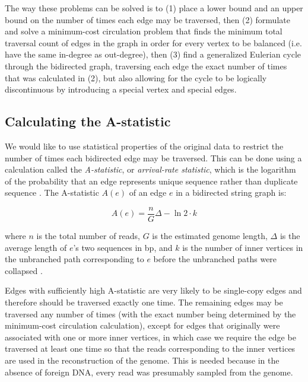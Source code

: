 \documentclass[12pt]{article}
\newcommand{\KeyTerm}[1]{{\it #1}}
\begin{document}
The way these problems can be solved is to (1) place a lower bound and an upper
bound on the number of times each edge may be traversed, then (2) formulate and
solve a minimum-cost circulation problem that finds the minimum total traversal
count of edges in the graph in order for every vertex to be balanced (i.e. have
the same in-degree as out-degree), then (3) find a generalized Eulerian cycle
through the bidirected graph, traversing each edge the exact number of times
that was calculated in (2), but also allowing for the cycle to be logically
discontinuous by introducing a special vertex and special edges.

\subsection{Calculating the A-statistic}

\label{subsec:a_statistics}

We would like to use statistical properties of the original data to restrict the
number of times each bidirected edge may be traversed.  This can be done using a
calculation called the \KeyTerm{A-statistic}, or \KeyTerm{arrival-rate
statistic}, which is the logarithm of the probability that an edge represents
unique sequence rather than duplicate sequence \cite{Myers2005}.  The
A-statistic $A(e)$ of an edge $e$ in a bidirected string graph is:

\[ A(e) = \frac{n}{G} \Delta - \ln{2} \cdot {k} \]

where $n$ is the total number of reads, $G$ is the estimated genome length,
$\Delta$ is the average length of $e$'s two sequences in bp, and $k$
is the number of inner vertices in the unbranched path corresponding to $e$
before the unbranched paths were collapsed \cite{Myers2005}.

Edges with sufficiently high A-statistic are very likely to be single-copy edges
and therefore should be traversed exactly one time.  The remaining edges may be
traversed any number of times (with the exact number being determined by the
minimum-cost circulation calculation), except for edges that originally were
associated with one or more inner vertices, in which case we require the edge be
traversed at least one time so that the reads corresponding to the inner
vertices are used in the reconstruction of the genome.  This is needed because
in the absence of foreign DNA, every read was presumably sampled from the
genome.
\end{document}
